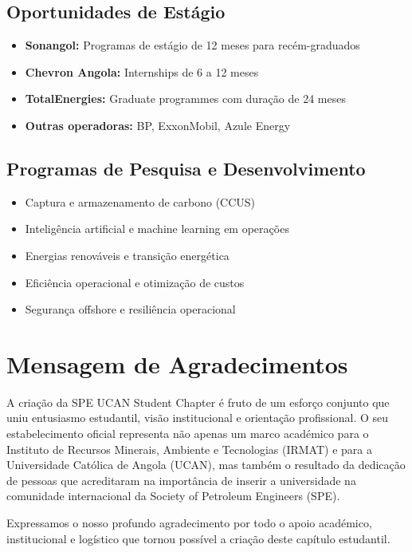 \documentclass[12pt]{article}
\begin{document}
\subsection{Oportunidades de Estágio}

\begin{itemize}
    \item \textbf{Sonangol:} Programas de estágio de 12 meses para recém-graduados
    \item \textbf{Chevron Angola:} Internships de 6 a 12 meses
    \item \textbf{TotalEnergies:} Graduate programmes com duração de 24 meses
    \item \textbf{Outras operadoras:} BP, ExxonMobil, Azule Energy
\end{itemize}

\subsection{Programas de Pesquisa e Desenvolvimento}

\begin{itemize}
    \item Captura e armazenamento de carbono (CCUS)
    \item Inteligência artificial e machine learning em operações
    \item Energias renováveis e transição energética
    \item Eficiência operacional e otimização de custos
    \item Segurança offshore e resiliência operacional
\end{itemize}

\newpage

\section{Mensagem de Agradecimentos}

A criação da SPE UCAN Student Chapter é fruto de um esforço conjunto que uniu entusiasmo estudantil, visão institucional e orientação profissional. O seu estabelecimento oficial representa não apenas um marco académico para o Instituto de Recursos Minerais, Ambiente e Tecnologias (IRMAT) e para a Universidade Católica de Angola (UCAN), mas também o resultado da dedicação de pessoas que acreditaram na importância de inserir a universidade na comunidade internacional da Society of Petroleum Engineers (SPE).

Expressamos o nosso profundo agradecimento por todo o apoio académico, institucional e logístico que tornou possível a criação deste capítulo estudantil.
\end{document}
